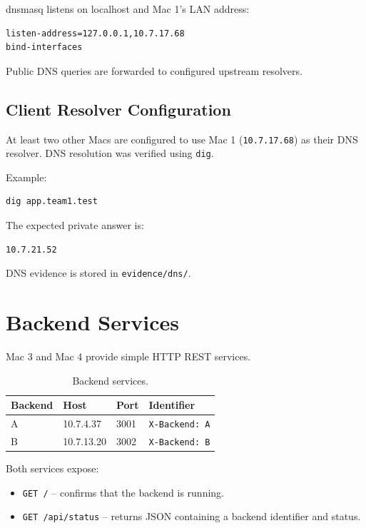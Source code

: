 \documentclass[11pt,a4paper]{article}
\begin{document}
dnsmasq listens on localhost and Mac 1's LAN address:

\begin{lstlisting}
listen-address=127.0.0.1,10.7.17.68
bind-interfaces
\end{lstlisting}

Public DNS queries are forwarded to configured upstream resolvers.

\subsection{Client Resolver Configuration}

At least two other Macs are configured to use Mac 1
(\texttt{10.7.17.68}) as their DNS resolver. DNS resolution was verified
using \texttt{dig}.

Example:

\begin{lstlisting}
dig app.team1.test
\end{lstlisting}

The expected private answer is:

\begin{lstlisting}
10.7.21.52
\end{lstlisting}

DNS evidence is stored in \texttt{evidence/dns/}.

\section{Backend Services}

Mac 3 and Mac 4 provide simple HTTP REST services.

\begin{table}[H]
\centering
\begin{tabular}{llll}
\toprule
\textbf{Backend} & \textbf{Host} & \textbf{Port} & \textbf{Identifier} \\
\midrule
A & 10.7.4.37 & 3001 & \texttt{X-Backend: A} \\
B & 10.7.13.20 & 3002 & \texttt{X-Backend: B} \\
\bottomrule
\end{tabular}
\caption{Backend services.}
\end{table}

Both services expose:

\begin{itemize}
    \item \texttt{GET /} -- confirms that the backend is running.
    \item \texttt{GET /api/status} -- returns JSON containing a backend identifier and status.
\end{itemize}
\end{document}
